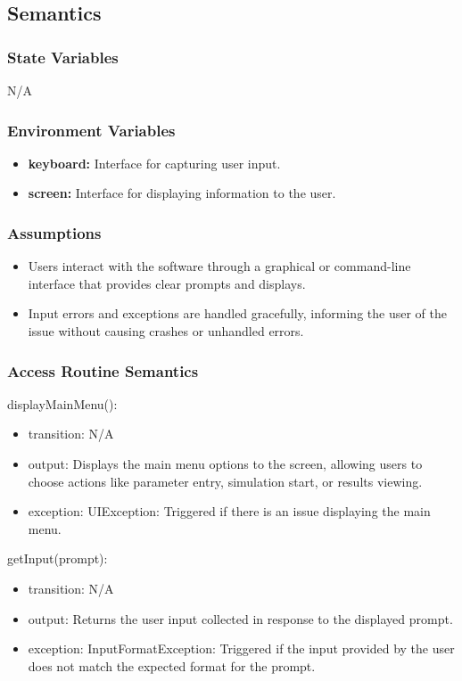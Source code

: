 \documentclass[12pt, titlepage]{article}
\begin{document}
\subsection{Semantics}

\subsubsection{State Variables}
N/A

\subsubsection{Environment Variables}
\begin{itemize}
  \item \textbf{keyboard:} Interface for capturing user input.
  \item \textbf{screen:} Interface for displaying information to the user.
\end{itemize}

\subsubsection{Assumptions}

\begin{itemize}
  \item Users interact with the software through a graphical or command-line interface that provides clear prompts and displays.
  \item Input errors and exceptions are handled gracefully, informing the user of the issue without causing crashes or unhandled errors.
\end{itemize}

\subsubsection{Access Routine Semantics}

\noindent displayMainMenu():
\begin{itemize}
\item transition: N/A
\item output: Displays the main menu options to the screen, allowing users to choose actions like parameter entry, simulation start, or results viewing.
\item exception: UIException: Triggered if there is an issue displaying the main menu.
\end{itemize}

\noindent getInput(prompt):
\begin{itemize}
\item transition: N/A
\item output: Returns the user input collected in response to the displayed prompt.
\item exception: InputFormatException: Triggered if the input provided by the user does not match the expected format for the prompt.
\end{itemize}
\end{document}
